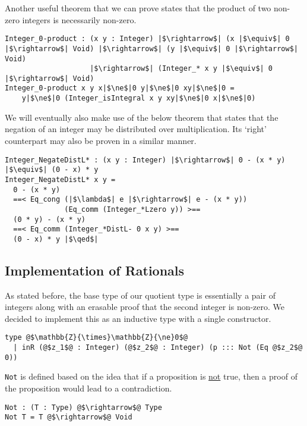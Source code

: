 \documentclass[12pt,twoside,maitrise]{dms}
\theoremstyle{definition}
\numberwithin{equation}{section}
\numberwithin{table}{chapter}
\numberwithin{figure}{chapter}
\newcommand\id[1] {\texttt{#1}}
\renewcommand\qed{\blacksquare}
\begin{document}
Another useful theorem that we can prove states that the product of two non-zero integers is necessarily non-zero.

\begin{verbatim}
Integer_0-product : (x y : Integer) |$\rightarrow$| (x |$\equiv$| 0 |$\rightarrow$| Void) |$\rightarrow$| (y |$\equiv$| 0 |$\rightarrow$| Void)
                    |$\rightarrow$| (Integer_* x y |$\equiv$| 0 |$\rightarrow$| Void)
Integer_0-product x y x|$\ne$|0 y|$\ne$|0 xy|$\ne$|0 =
    y|$\ne$|0 (Integer_isIntegral x y xy|$\ne$|0 x|$\ne$|0)
\end{verbatim}

We will eventually also make use of the below theorem that states that the negation of an integer may be distributed over multiplication. Its `right' counterpart may also be proven in a similar manner.

\begin{verbatim}
Integer_NegateDistL* : (x y : Integer) |$\rightarrow$| 0 - (x * y) |$\equiv$| (0 - x) * y
Integer_NegateDistL* x y =
  0 - (x * y)
  ==< Eq_cong (|$\lambda$| e |$\rightarrow$| e - (x * y))
              (Eq_comm (Integer_*Lzero y)) >==
  (0 * y) - (x * y)
  ==< Eq_comm (Integer_*DistL- 0 x y) >==
  (0 - x) * y |$\qed$|
\end{verbatim}

\subsection*{Implementation of Rationals}
As stated before, the base type of our quotient type is essentially a pair of
integers along with an erasable proof that the second integer is non-zero. We
decided to implement this as an inductive type with a single constructor.

\begin{verbatim}
type @$\mathbb{Z}{\times}\mathbb{Z}{\ne}0$@
  | inR (@$z_1$@ : Integer) (@$z_2$@ : Integer) (p ::: Not (Eq @$z_2$@ 0))
\end{verbatim}

\id{Not} is defined based on the idea that if a proposition is \underline{not}
true, then a proof of the proposition would lead to a contradiction.

\begin{verbatim}
Not : (T : Type) @$\rightarrow$@ Type
Not T = T @$\rightarrow$@ Void
\end{verbatim}
\end{document}
